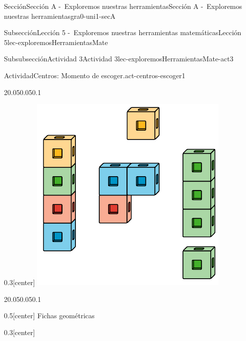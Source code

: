 \documentclass[twoside,10pt,]{article}
\begin{document}
\begin{sectionptx}{Sección}{Sección A -~Exploremos nuestras herramientas}{}{Sección A -~Exploremos nuestras herramientas}{}{}{gra0-uni1-secA}
\begin{subsectionptx}{Subsección}{Lección 5 -~Exploremos nuestras herramientas matemáticas}{}{Lección 5}{}{}{lec-exploremosHerramientasMate}
\begin{subsubsectionptx}{Subsubsección}{Actividad 3}{}{Actividad 3}{}{}{lec-exploremosHerramientasMate-act3}
\begin{activity}{Actividad}{Centros: Momento de escoger.}{act-centros-escoger1}
\begin{sidebyside}{2}{0.05}{0.05}{0.1}
\begin{sbspanel}{0.3}[center]
\includegraphics[width=\linewidth]{external/svg-source/tikz-file-128850.pdf}
\end{sbspanel}%
\end{sidebyside}%
\begin{sidebyside}{2}{0.05}{0.05}{0.1}%
\begin{sbspanel}{0.5}[center]%
Fichas geométricas%
\end{sbspanel}%
\begin{sbspanel}{0.3}[center]%

\end{sbspanel}
\end{sidebyside}
\end{activity}
\end{subsubsectionptx}
\end{subsectionptx}
\end{sectionptx}
\end{document}
